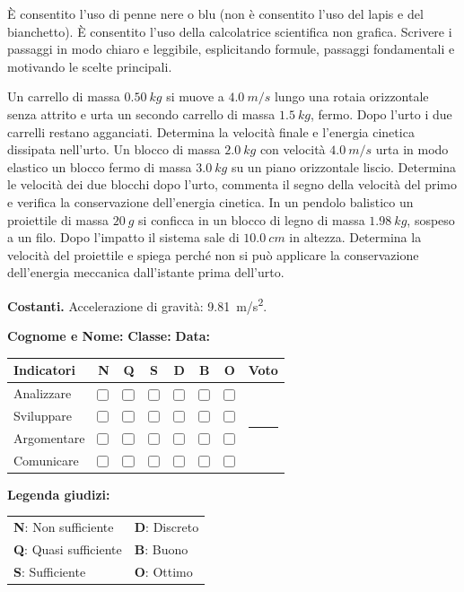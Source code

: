\documentclass[a4paper,10pt]{exam}
\makeatletter
\newcommand{\um}[2]{\SI[output-decimal-marker={,}]{#1}{#2}}
\newcommand{\cbox}{\ensuremath{\vcenter{\hbox{\tikz{\draw[black!75, line width=0.5pt, rounded corners=1.2pt] (0,0) rectangle (3.0mm, 3.0mm);}}}}}
\newcommand{\grigliacompetenze}{
\vspace{1mm}
\noindent
\begin{minipage}[c]{0.62\linewidth}
\footnotesize
\setlength{\aboverulesep}{0pt}
\setlength{\belowrulesep}{0pt}
\renewcommand{\arraystretch}{1.25}
\begin{tabular}{l cc >{\columncolor{gray!20}}c ccc c}
\toprule
\rowcolor{gray!10}
\textbf{Indicatori} & \textbf{N} & \textbf{Q} & \cellcolor{gray!20}\textbf{S} & \textbf{D} & \textbf{B} & \textbf{O} & \textbf{Voto} \\
\midrule
Analizzare    & \cbox & \cbox & \cbox & \cbox & \cbox & \cbox & \multirow{4}{*}{\rule{1.4cm}{0pt}} \\
Sviluppare    & \cbox & \cbox & \cbox & \cbox & \cbox & \cbox & \\
Argomentare   & \cbox & \cbox & \cbox & \cbox & \cbox & \cbox & \\
Comunicare    & \cbox & \cbox & \cbox & \cbox & \cbox & \cbox & \\
\bottomrule
\end{tabular}
\end{minipage}\hfill
\begin{minipage}[c]{0.35\linewidth}
\scriptsize \color{black!75}
\textbf{Legenda giudizi:}\par\vspace{1mm}
\begin{tabular}{@{}ll@{}}
\textbf{N}: Non sufficiente & \textbf{D}: Discreto \\
\textbf{Q}: Quasi sufficiente & \textbf{B}: Buono \\
\textbf{S}: Sufficiente & \textbf{O}: Ottimo \\
\end{tabular}
\end{minipage}
}
\newcommand{\supportiprova}[1]{%
  \par\noindent\begin{minipage}{\linewidth}\small
  #1
  \end{minipage}\par\vspace{3mm}%
}
\makeatother
\begin{document}
\begin{tcolorbox}[istruzionibox]
È consentito l'uso di penne nere o blu (non è consentito l'uso del lapis e del bianchetto).
È consentito l'uso della calcolatrice scientifica non grafica.
Scrivere i passaggi in modo chiaro e leggibile, esplicitando formule, passaggi fondamentali e motivando le scelte principali.
\end{tcolorbox}

\vspace{1.5mm}


\begin{questions}
\question Un carrello di massa $\um{0.50}{kg}$ si muove a $\um{4.0}{m/s}$ lungo una rotaia orizzontale senza attrito e urta un secondo carrello di massa $\um{1.5}{kg}$, fermo. Dopo l'urto i due carrelli restano agganciati. Determina la velocità finale e l'energia cinetica dissipata nell'urto.
\question Un blocco di massa $\um{2.0}{kg}$ con velocità $\um{4.0}{m/s}$ urta in modo elastico un blocco fermo di massa $\um{3.0}{kg}$ su un piano orizzontale liscio. Determina le velocità dei due blocchi dopo l'urto, commenta il segno della velocità del primo e verifica la conservazione dell'energia cinetica.
\question In un pendolo balistico un proiettile di massa $\um{20}{g}$ si conficca in un blocco di legno di massa $\um{1.98}{kg}$, sospeso a un filo. Dopo l'impatto il sistema sale di $\um{10.0}{cm}$ in altezza. Determina la velocità del proiettile e spiega perché non si può applicare la conservazione dell'energia meccanica dall'istante prima dell'urto.
\end{questions}

\null
\vfill

\supportiprova{\textbf{Costanti.} Accelerazione di gravità: \um{9.81}{m/s^2}.}
\noindent
\textbf{Cognome e Nome:}\enspace\hrulefill\hspace{1cm}%
\textbf{Classe:}\enspace\makebox[2.5cm]{\hrulefill}\hspace{1cm}%
\textbf{Data:}\enspace\makebox[2.5cm]{\hrulefill}

\vspace{3mm}
\grigliacompetenze
\end{document}

